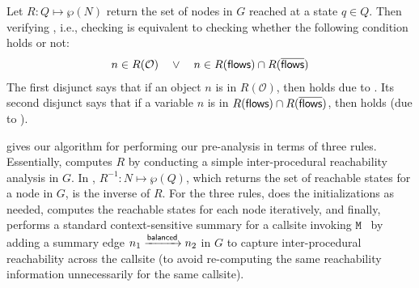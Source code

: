 Let $R:Q \mapsto \wp(N)$ return 
the set of nodes in $G$ reached at a  state $q \in Q$. Then verifying \selconThree, i.e., checking  is equivalent to checking whether the following condition holds or not:
\begin{equation}
\label{eqn:cflcsconditionFinal}
\begin{split}
    n \in R(\mathcal{O}) \quad \vee \quad  n \in R(\textsf{flows}) \cap R(\overline{\textsf{flows}})
\end{split}
\end{equation}
The first disjunct says that if
an object $n$ is in $R(\mathcal{O})$, then
 holds due to \propo.  Its second disjunct says that
if a variable $n$ is in  $ R(\textsf{flows}) \cap R(\overline{\textsf{flows}})$, then  holds (due to \propv).


 gives our algorithm for performing our \tool pre-analysis
in terms of three rules. Essentially, \tool computes $R$ by conducting a simple inter-procedural reachability analysis in $G$. In , $R^{-1}: N \mapsto \wp(Q)$, which returns the set of reachable states for a node in $G$, is the inverse  of $R$.
For
the three rules,
 does the initializations as needed,   computes the reachable states for each node iteratively, and finally,  performs a standard context-sensitive summary for a callsite invoking $\mathtt{M}$~\cite{reps1995precise} by 
adding a summary edge
$n_1\xrightarrow[]{\textsf{balanced}}n_2$ in $G$ to capture   
inter-procedural reachability across the callsite (to avoid re-computing
the same reachability information unnecessarily for the same callsite).


